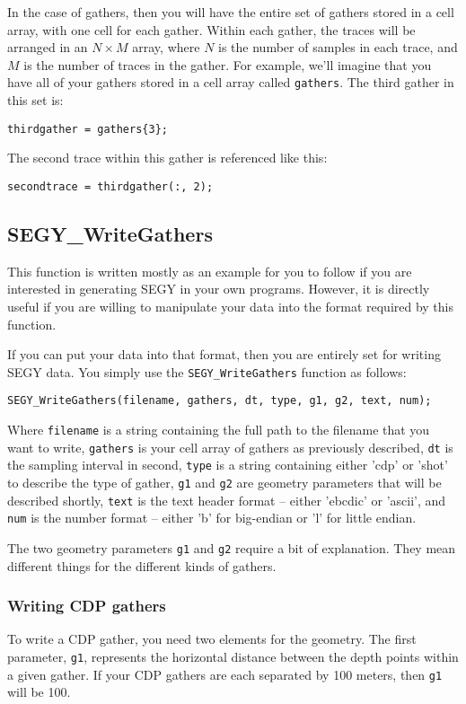 \documentclass[10pt]{article}
\newcommand{\segy}{{\scriptsize SEGY}\xspace}
\newcommand{\cdp}{{\scriptsize CDP}\xspace}
\begin{document}
In the case of gathers, then you will have the entire set of gathers
stored in a cell array, with one cell for each gather. Within each
gather, the traces will be arranged in an $N \times M$ array, where
$N$ is the number of samples in each trace, and $M$ is the number of
traces in the gather. For example, we'll imagine that you have all of
your gathers stored in a cell array called {\tt gathers}. The third
gather in this set is:

\begin{verbatim}
thirdgather = gathers{3};
\end{verbatim}

The second trace within this gather is referenced like this:

\begin{verbatim}
secondtrace = thirdgather(:, 2);
\end{verbatim}

\subsection{SEGY\_WriteGathers}

This function is written mostly as an example for you to follow if you
are interested in generating \segy in your own programs. However, it
is directly useful if you are willing to manipulate your data into the
format required by this function.

If you can put your data into that format, then you are entirely set
for writing \segy data. You simply use the {\tt SEGY\_WriteGathers}
function as follows:

\begin{verbatim}
SEGY_WriteGathers(filename, gathers, dt, type, g1, g2, text, num);
\end{verbatim}
Where {\tt filename} is a string containing the full path to the
filename that you want to write, {\tt gathers} is your cell array of
gathers as previously described, {\tt dt} is the sampling interval in
second, {\tt type} is a string containing either 'cdp' or 'shot' to
describe the type of gather, {\tt g1} and {\tt g2} are geometry
parameters that will be described shortly, {\tt text} is the text
header format -- either 'ebcdic' or 'ascii', and {\tt num} is the
number format -- either 'b' for big-endian or 'l' for little endian.

The two geometry parameters {\tt g1} and {\tt g2} require a bit of
explanation. They mean different things for the different kinds of
gathers.
\subsubsection{Writing \cdp gathers}
To write a \cdp gather, you need two elements for the geometry. The
first parameter, {\tt g1}, represents the horizontal distance between
the depth points within a given gather. If your \cdp gathers are each
separated by 100 meters, then {\tt g1} will be 100.
\end{document}
